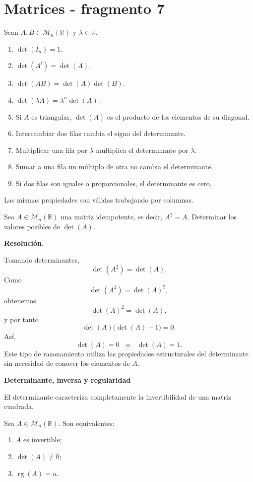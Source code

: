 \section{Matrices - fragmento 7}
\begin{theorem}
Sean $A,B\in\mathcal M_n(\mathbb{R})$ y $\lambda\in\mathbb{R}$.
\begin{enumerate}[label=\alph*)]
\item $\det(I_n)=1$.
\item $\det(A^t)=\det(A)$.
\item $\det(AB)=\det(A)\det(B)$.
\item $\det(\lambda A)=\lambda^n\det(A)$.
\item Si $A$ es triangular, $\det(A)$ es el producto de los elementos de su diagonal.
\item Intercambiar dos filas cambia el signo del determinante.
\item Multiplicar una fila por $\lambda$ multiplica el determinante por $\lambda$.
\item Sumar a una fila un múltiplo de otra no cambia el determinante.
\item Si dos filas son iguales o proporcionales, el determinante es cero.
\end{enumerate}
\end{theorem}

Las mismas propiedades son válidas trabajando por columnas.

\begin{solvedexercise}
Sea $A\in\mathcal M_n(\mathbb{R})$ una matriz idempotente, es decir, $A^2=A$. Determinar los valores posibles de $\det(A)$.

\textbf{Resolución.}\par\smallskip
Tomando determinantes,
\[
\det(A^2)=\det(A).
\]
Como
\[
\det(A^2)=\det(A)^2,
\]
obtenemos
\[
\det(A)^2=\det(A),
\]
y por tanto
\[
\det(A)\bigl(\det(A)-1\bigr)=0.
\]
Así,
\[
\boxed{\det(A)=0\quad\text{o}\quad\det(A)=1.}
\]
Este tipo de razonamiento utiliza las propiedades estructurales del determinante sin necesidad de conocer los elementos de $A$.
\end{solvedexercise}

\textbf{Determinante, inversa y regularidad}

El determinante caracteriza completamente la invertibilidad de una matriz cuadrada.

\begin{theorem}
Sea $A\in\mathcal M_n(\mathbb{R})$. Son equivalentes:
\begin{enumerate}[label=\roman*)]
\item $A$ es invertible;
\item $\det(A)\neq0$;
\item $\operatorname{rg}(A)=n$.
\end{enumerate}
\end{theorem}

